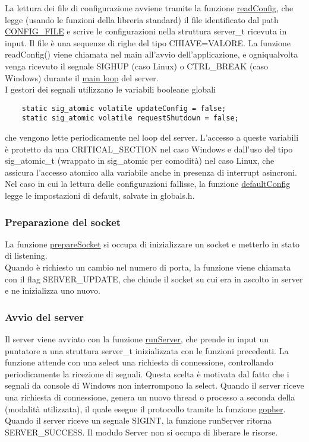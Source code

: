 \documentclass{article}
\begin{document}
La lettura dei file di configurazione avviene tramite la funzione \href{html/server_8c.html#a2e07cc3959eab913ab4c894bc6c8395d}
{readConfig}, che legge (usando le funzioni della libreria standard) il file identificato 
dal path \href{html/globals_8h_source.html}{CONFIG\_FILE} e scrive le configurazioni nella struttura server\_t ricevuta in input.
Il file è una sequenze di righe del tipo CHIAVE=VALORE.
La funzione readConfig() viene chiamata nel main all'avvio dell'applicazione, e ogniqualvolta
venga ricevuto il segnale SIGHUP (caso Linux) o CTRL\_BREAK (caso Windows) durante il \href{html/server_8h.html#a533c9a4292e9d1106ff7c54fbf75090a}
{main loop} del server.\\
I gestori dei segnali utilizzano le variabili booleane globali
\begin{lstlisting}
    static sig_atomic volatile updateConfig = false;
    static sig_atomic volatile requestShutdown = false;
\end{lstlisting}
che vengono lette periodicamente nel loop del server. L'accesso a queste variabili è protetto da una 
CRITICAL\_SECTION nel caso Windows e dall'uso del tipo sig\_atomic\_t (wrappato in sig\_atomic per comodità)
nel caso Linux, che assicura l'accesso atomico alla variabile anche in presenza di interrupt asincroni.
Nel caso in cui la lettura delle configurazioni fallisse, la funzione \href{html/server_8h.html#a2cda6ac8456a82040d05596906d66acc}{defaultConfig}
legge le impostazioni di default, salvate in globals.h.

\subsubsection{Preparazione del socket}

La funzione \href{html/server_8h.html#a4c40ae864a752c34a4f237a9445db202}{prepareSocket} si occupa
di inizializzare un socket e metterlo in stato di listening.\\
Quando è richiesto un cambio nel numero di porta, la funzione viene chiamata con il flag SERVER\_UPDATE,
che chiude il socket su cui era in ascolto in server e ne inizializza uno nuovo.

\subsubsection{Avvio del server}

Il server viene avviato con la funzione \href{html/server_8h.html#a533c9a4292e9d1106ff7c54fbf75090a}{runServer},
che prende in input un puntatore a una struttura server\_t inizializzata con le funzioni precedenti.
La funzione attende con una select una richiesta di connessione, controllando periodicamente la ricezione
di segnali. Questa scelta è motivata dal fatto che i segnali da console di Windows non interrompono la select.
Quando il server riceve una richiesta di connessione, genera un nuovo thread o processo a seconda della (modalità
utilizzata), il quale esegue il protocollo tramite la funzione \href{html/protocol_8h.html#a733e68cc8d5f947c30d0ca51e1b76d9b}{gopher}.
Quando il server riceve un segnale SIGINT, la funzione runServer ritorna SERVER\_SUCCESS. Il modulo Server
non si occupa di liberare le risorse.
\end{document}
